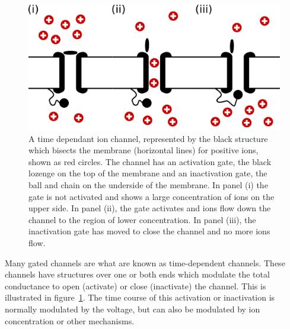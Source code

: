 \begin{figure}
\begin{center}
\includegraphics{figures/intro/activation_gate}
\end{center}
\caption[Time-Dependent Ion Channel]{
\label{fig:intro:heart:gated_ion}
A time dependant ion channel, represented by the black structure which bisects
the membrane (horizontal lines) for positive ions, shown as red circles.
The channel has an activation gate, the black lozenge on the top of the
membrane and an inactivation gate, the ball and chain on the underside of the
membrane.
In panel (i) the gate is not activated and shows a large concentration of ions
on the upper side.
In panel (ii), the gate activates and ions flow down the channel to the region
of lower concentration.
In panel (iii), the inactivation gate has moved to close the channel and no more
ions flow.
}
\end{figure}


Many gated channels are what are known as time-dependent channels.
These channels have structures over one or both ends which modulate the total
conductance to open (activate) or close (inactivate) the channel.
This is illustrated in figure~\ref{fig:intro:heart:gated_ion}.
The time course of this activation or inactivation is normally modulated by the
voltage, but can also be modulated by ion concentration or other mechanisms.

